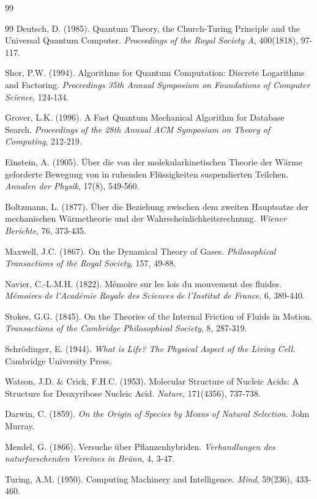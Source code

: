\documentclass[12pt,a4paper]{article}
\begin{document}
\begin{thebibliography}{99}
\begin{thebibliography}{99}
Deutsch, D. (1985). Quantum Theory, the Church-Turing Principle and the Universal Quantum Computer. \textit{Proceedings of the Royal Society A}, 400(1818), 97-117.

Shor, P.W. (1994). Algorithms for Quantum Computation: Discrete Logarithms and Factoring. \textit{Proceedings 35th Annual Symposium on Foundations of Computer Science}, 124-134.

Grover, L.K. (1996). A Fast Quantum Mechanical Algorithm for Database Search. \textit{Proceedings of the 28th Annual ACM Symposium on Theory of Computing}, 212-219.

Einstein, A. (1905). Über die von der molekularkinetischen Theorie der Wärme geforderte Bewegung von in ruhenden Flüssigkeiten suspendierten Teilchen. \textit{Annalen der Physik}, 17(8), 549-560.

Boltzmann, L. (1877). Über die Beziehung zwischen dem zweiten Hauptsatze der mechanischen Wärmetheorie und der Wahrscheinlichkeitsrechnung. \textit{Wiener Berichte}, 76, 373-435.

Maxwell, J.C. (1867). On the Dynamical Theory of Gases. \textit{Philosophical Transactions of the Royal Society}, 157, 49-88.

Navier, C.-L.M.H. (1822). Mémoire sur les lois du mouvement des fluides. \textit{Mémoires de l'Académie Royale des Sciences de l'Institut de France}, 6, 389-440.

Stokes, G.G. (1845). On the Theories of the Internal Friction of Fluids in Motion. \textit{Transactions of the Cambridge Philosophical Society}, 8, 287-319.

Schrödinger, E. (1944). \textit{What is Life? The Physical Aspect of the Living Cell}. Cambridge University Press.

Watson, J.D. \& Crick, F.H.C. (1953). Molecular Structure of Nucleic Acids: A Structure for Deoxyribose Nucleic Acid. \textit{Nature}, 171(4356), 737-738.

Darwin, C. (1859). \textit{On the Origin of Species by Means of Natural Selection}. John Murray.

Mendel, G. (1866). Versuche über Pflanzenhybriden. \textit{Verhandlungen des naturforschenden Vereines in Brünn}, 4, 3-47.

Turing, A.M. (1950). Computing Machinery and Intelligence. \textit{Mind}, 59(236), 433-460.


\end{thebibliography}
\end{thebibliography}
\end{document}
